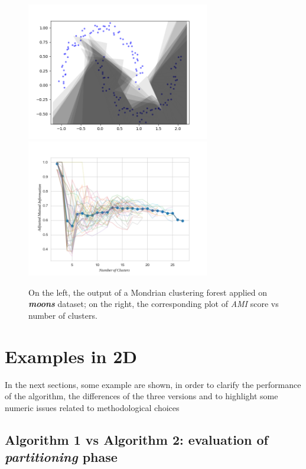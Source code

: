 \documentclass[a4paper]{article}
\begin{document}
\begin{figure}[H]
        \centering
        \includegraphics[width=8cm]{grafici/moons_plot_binario.png}      
        \includegraphics[width=8cm]{grafici/makemoons_2_escluso1_2.png}   
\caption{On the left, the output of a Mondrian clustering forest applied on \emph{\textbf{moons}} dataset; on the right, the corresponding plot of \emph{AMI} score vs number of clusters.}
        \label{forest}
    \end{figure}   



\newpage
\section{Examples in 2D}\label{section_examples}




In the next sections, some example are shown, in order to clarify the performance of the algorithm, the differences of the three versions and to highlight some numeric issues related to methodological choices






\subsection{Algorithm 1 vs Algorithm 2: evaluation of \emph{partitioning} phase}
\end{document}
